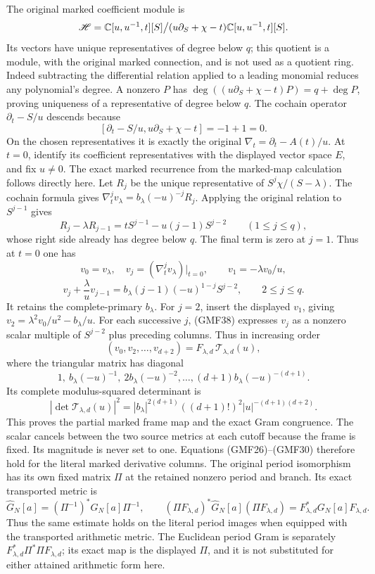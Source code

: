 \documentclass[11pt,a4paper]{article}
\begin{document}
The original marked coefficient module is
\[
 \mathscr H=\mathbb C[u,u^{-1},t][S]\big/
       (u\partial_S+\chi-t)\mathbb C[u,u^{-1},t][S].
\]
Its vectors have unique representatives of degree below
\(q\); this quotient is a module, with the original marked
connection, and is not used as a quotient ring.
Indeed subtracting the differential relation applied to
a leading monomial reduces any polynomial's degree.
A nonzero \(P\) has
\(\deg((u\partial_S+\chi-t)P)=q+\deg P\), proving
uniqueness of a representative of degree below \(q\).
The cochain operator \(\partial_t-S/u\) descends because
\[
 [\partial_t-S/u,u\partial_S+\chi-t]=-1+1=0.
\]
On the chosen representatives it is exactly the original
\(\nabla_t=\partial_t-A(t)/u\).
At \(t=0\), identify its coefficient representatives with
the displayed vector space \(E\), and fix \(u\ne0\).
The exact marked recurrence from the marked-map
calculation \cite{a02gmf:markedProvider} follows directly here.
Let \(R_j\) be the unique representative of
\(S^j\chi/(S-\lambda)\).  The cochain formula gives
\(\nabla_t^jv_\lambda=b_\lambda(-u)^{-j}R_j\).
Applying the original relation to \(S^{j-1}\) gives
\[
 R_j-\lambda R_{j-1}
   =tS^{j-1}-u(j-1)S^{j-2}\qquad(1\le j\le q),
\]
whose right side already has degree below \(q\).
The final term is zero at \(j=1\).
Thus at \(t=0\) one has
\[
 v_0=v_\lambda,\quad v_j=(\nabla_t^j v_\lambda)|_{t=0},
 \qquad v_1=-\lambda v_0/u,
\]
\begin{equation}\tag{GMF38}
 v_j+\frac{\lambda}{u}v_{j-1}
   =b_\lambda(j-1)(-u)^{1-j}S^{j-2},
                    \qquad 2\le j\le q.
\end{equation}
It retains the complete-primary \(b_\lambda\).
For \(j=2\), insert the displayed \(v_1\), giving
\(v_2=\lambda^2v_0/u^2-b_\lambda/u\).
For each successive \(j\), (GMF38) expresses \(v_j\)
as a nonzero scalar multiple of \(S^{j-2}\) plus preceding
columns.  Thus in increasing order
\[
 (v_0,v_2,\ldots,v_{d+2})
       =F_{\lambda,d}\,\mathcal T_{\lambda,d}(u),
\]
where the triangular matrix has diagonal
\[
 1,\ b_\lambda(-u)^{-1},\
 2b_\lambda(-u)^{-2},\ldots,
 (d+1)b_\lambda(-u)^{-(d+1)}.
\]
Its complete modulus-squared determinant is
\begin{equation}\tag{GMF39}
 |\det\mathcal T_{\lambda,d}(u)|^2
 =|b_\lambda|^{2(d+1)}((d+1)!)^2
                        |u|^{-(d+1)(d+2)}.
\end{equation}
This proves the partial marked frame map and the exact
Gram congruence.  The scalar cancels between the two source
metrics at each cutoff because the frame is fixed.
Its magnitude is never set to one.  Equations (GMF26)--(GMF30)
therefore hold for the literal marked derivative columns.
The original period isomorphism has its own fixed matrix
\(\Pi\) at the retained nonzero period and branch.  Its exact
transported metric is
\[
 \widehat G_N[a]=(\Pi^{-1})^*G_N[a]\Pi^{-1},\qquad
 (\Pi F_{\lambda,d})^*\widehat G_N[a](\Pi F_{\lambda,d})
                  =F_{\lambda,d}^*G_N[a]F_{\lambda,d}.
\]
Thus the same estimate holds on the literal period images
when equipped with the transported arithmetic metric.
The Euclidean period Gram is separately
\(F_{\lambda,d}^*\Pi^*\Pi F_{\lambda,d}\);
its exact map is the displayed \(\Pi\), and it is not
substituted for either attained arithmetic form here.
\end{document}
